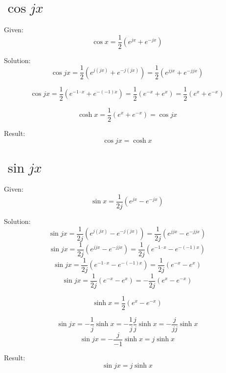 \documentclass[a4paper, 10pt]{scrartcl}
\begin{document}
\section{$\cos{jx}$}

Given:
\[\cos{x} = \frac{1}{2}(e^{jx} + e^{-jx})\]

Solution:
\[\cos{jx} = \frac{1}{2}(e^{j(jx)} + e^{-j(jx)}) =
             \frac{1}{2}(e^{jjx} + e^{-jjx})\]

\[\cos{jx} = \frac{1}{2}(e^{-1\cdot x} + e^{-(-1)x}) =
             \frac{1}{2}(e^{-x} + e^{x}) = \frac{1}{2}(e^{x} + e^{-x})\]

\[\cosh{x} = \frac{1}{2}(e^{x} + e^{-x}) = \cos{jx}\]

Result:
\[\cos{jx} = \cosh{x}\]

\section{$\sin{jx}$}

Given:
\[\sin{x} = \frac{1}{2j}(e^{jx} - e^{-jx})\]

Solution:
\[\sin{jx} = \frac{1}{2j}(e^{j(jx)} - e^{-j(jx)}) = \frac{1}{2j}(e^{jjx} - e^{-jjx})\]
\[\sin{jx} = \frac{1}{2j}(e^{jjx} - e^{-jjx}) = \frac{1}{2j}(e^{-1\cdot x} - e^{-(-1)x})\]
\[\sin{jx} = \frac{1}{2j}(e^{-1\cdot x} - e^{-(-1)x}) = \frac{1}{2j}(e^{-x} - e^{x})\]
\[\sin{jx} = \frac{1}{2j}(e^{-x} - e^{x}) = -\frac{1}{2j}(e^{x} - e^{-x})\]

\[\sinh{x} = \frac{1}{2}(e^{x} - e^{-x})\]

\[\sin{jx} = -\frac{1}{j}\sinh{x} = -\frac{1}{j}\frac{j}{j}\sinh{x} = -\frac{j}{jj}\sinh{x}\]
\[\sin{jx} = -\frac{j}{-1}\sinh{x} = j\sinh{x}\]

Result:
\[\sin{jx} = j\sinh{x}\]
\end{document}
